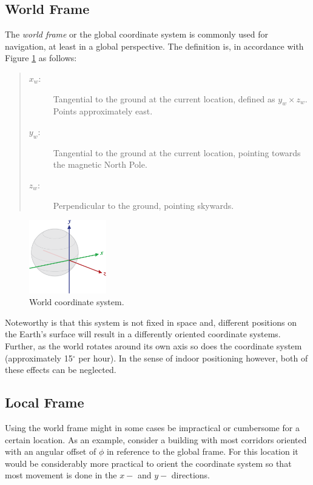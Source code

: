 \documentclass{LTHthesis}
\begin{document}
\subsection{World Frame}
%
The \emph{world frame} or the global coordinate system is commonly used for navigation, at least in a global perspective. The definition is, in accordance with Figure \ref{axis_globe} as follows:
%
\begin{quote}
\begin{description}
\item[$x_w$:] Tangential to the ground at the current location, defined as $y_w\times z_w$. Points approximately east. 
\item[$y_w$:] Tangential to the ground at the current location, pointing towards the magnetic North Pole.
\item[$z_w$:] Perpendicular to the ground, pointing skywards.
\end{description}
\end{quote}
%
\begin{figure}[!hbt]
\begin{center}

\includegraphics[width=0.3\textwidth ]{images/background_on_navigation/axis_globe.png}
\end{center}
\caption[]{World coordinate system.\footnotemark}\label{axis_globe}
\end{figure}
%
%
Noteworthy is that this system is not fixed in space and, different positions on the Earth's surface will result in a differently oriented coordinate systems. Further, as the world rotates around its own axis so does the coordinate system (approximately 15$^\circ$ per hour). In the sense of indoor positioning however, both of these effects can be neglected.
%
\subsection{Local Frame}
%
Using the world frame might in some cases be impractical or cumbersome for a certain location. As an example, consider a  building with most corridors oriented with an angular offset of $\phi$ in reference to the global frame. For this location it would be considerably more practical to orient the coordinate system so that most movement is done in the $x-$ and $y-$ directions.   
\end{document}

